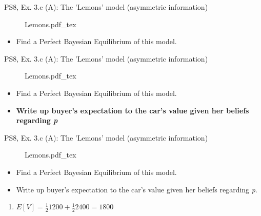 \begin{frame}{PS8, Ex. 3.c (A): The 'Lemons' model (asymmetric information)}
    \begin{figure}[!h]
      \center {}
      {Lemons.pdf_tex}
    \end{figure}
    \vspace{-8pt}
    \begin{itemize}
      \item[(c)] Find a Perfect Bayesian Equilibrium of this model.
    \end{itemize}
    \vfill\null
\end{frame}
\begin{frame}{PS8, Ex. 3.c (A): The 'Lemons' model (asymmetric information)}
    \begin{figure}[!h]
      \center {}
      {Lemons.pdf_tex}
    \end{figure}
    \vspace{-8pt}
    \begin{itemize}
      \item[(c)] Find a Perfect Bayesian Equilibrium of this model.
    \end{itemize}
    \vspace{-12pt}
    \begin{multicols}{2}
      \begin{itemize}
        \item[Step 1:] \textbf{Write up buyer's expectation to the car's value given her beliefs regarding \textit{p}}
      \end{itemize}
      \vfill\null\columnbreak
      \vfill\null
    \end{multicols}
\end{frame}
\begin{frame}{PS8, Ex. 3.c (A): The 'Lemons' model (asymmetric information)}
    \begin{figure}[!h]
      \center {}
      {Lemons.pdf_tex}
    \end{figure}
    \vspace{-8pt}
    \begin{itemize}
      \item[(c)] Find a Perfect Bayesian Equilibrium of this model.
    \end{itemize}
    \vspace{-12pt}
    \begin{multicols}{2}
      \begin{itemize}
        \item[Step 1:] Write up buyer's expectation to the car's value given her beliefs regarding \textit{p}.
      \end{itemize}
      \vfill\null\columnbreak
      \begin{enumerate}
        \item $E[V]=\frac{1}{2}1200+\frac{1}{2}2400=1800$
      \end{enumerate}
      \vfill\null
    \end{multicols}
\end{frame}

